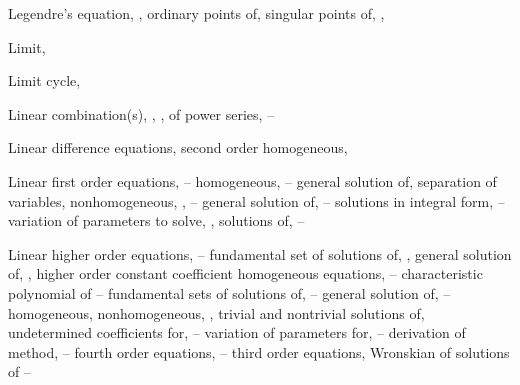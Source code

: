 \begin{theindex}
  \item Legendre's equation, \pageref{exer:5.1.7}, \pageref{eq:7.2.1}
    \subitem ordinary points of, \pageref{eq:7.2.1}
    \subitem singular points of, \pageref{eq:7.2.1}, \pageref{exer:7.4.22}

  \item Limit, \pageref{eq:8.1.12}

  \item Limit cycle, \pageref{exer:4.4.19}

  \item Linear combination(s), \pageref{thmtype:5.1.2}, \pageref{eq:9.1.3}, \pageref{eq:10.3.1}
    \subitem of power series, \pageref{example:7.1.5}--\pageref{exer:7.1.1}

  \item Linear difference equations, second order homogeneous, \pageref{exer:7.3.30}

  \item Linear first order equations, \pageref{eq:2.1.1}--\pageref{exer:2.1.49}
    \subitem homogeneous, \pageref{eq:2.1.1}--\pageref{eq:2.1.16}
      \subsubitem general solution of, \pageref{thmtype:2.1.1}
      \subsubitem separation of variables, \pageref{eq:2.1.16}
    \subitem nonhomogeneous, \pageref{eq:2.1.1}, \pageref{eq:2.1.16}--\pageref{exer:2.1.1}
      \subsubitem general solution of, \pageref{example:2.1.5}--\pageref{exer:2.1.1}
      \subsubitem solutions in integral form, \pageref{example:2.1.7}--\pageref{eq:2.1.30}
      \subsubitem variation of parameters to solve, \pageref{eq:2.1.16}, \pageref{eq:2.1.27}
    \subitem solutions of, \pageref{eq:2.1.2}--\pageref{eq:2.1.6}

  \item Linear higher order equations, \pageref{eq:9.1.1}--\pageref{exer:9.4.42}
    \subitem fundamental set of solutions of, \pageref{eq:9.1.3}, \pageref{thmtype:9.1.2}
    \subitem general solution of, \pageref{eq:9.1.3}, \pageref{thmtype:9.1.5}
    \subitem higher order constant coefficient homogeneous equations, \pageref{eq:9.2.1}--\pageref{exer:9.2.45} characteristic polynomial of \pageref{eq:9.2.2}--\pageref{thmtype:9.2.1}
      \subsubitem fundamental sets of solutions of, \pageref{eq:9.2.12}--\pageref{exer:9.2.1}
      \subsubitem general solution of, \pageref{example:9.2.1}--\pageref{example:9.2.4}
    \subitem homogeneous, \pageref{thmtype:9.1.1}
    \subitem nonhomogeneous, \pageref{thmtype:9.1.1}, \pageref{thmtype:9.1.5}
    \subitem trivial and nontrivial solutions of, \pageref{eq:9.1.3}
    \subitem undetermined coefficients for, \pageref{eq:9.3.1}--\pageref{exer:9.3.75}
    \subitem variation of parameters for, \pageref{eq:9.4.1}--\pageref{exer:9.4.42}
      \subsubitem derivation of method, \pageref{eq:9.4.1}--\pageref{eq:9.4.6}
      \subsubitem fourth order equations, \pageref{eq:9.4.9}--\pageref{eq:9.4.1}
      \subsubitem third order equations, \pageref{eq:9.4.7}
    \subitem Wronskian of solutions of \pageref{eq:9.1.13}--\pageref{thmtype:9.1.5}


\end{theindex}
